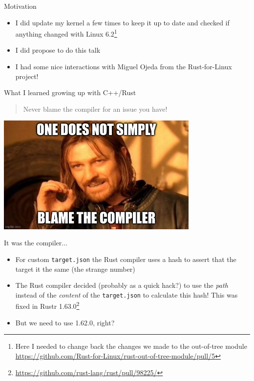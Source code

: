 \begin{frame}[c]{Motivation}
  \begin{itemize}
    \item I did update my kernel a few times to keep it up to date and checked
      if anything changed with Linux 6.2\footnote{Here I needed to change back
      the changes we made to the out-of-tree module
      \url{https://github.com/Rust-for-Linux/rust-out-of-tree-module/pull/5}}
    \item I did propose to do this talk
    \item I had some nice interactions with Miguel Ojeda from the
      Rust-for-Linux project!
  \end{itemize}
\end{frame}

\begin{frame}[c]{What I learned growing up with C++/Rust}
  \begin{quote}
    \centering
    Never blame the compiler for an issue you have!
  \end{quote}
  \pause \centering \includegraphics[width=0.75\textwidth]{img/one-does-not-simply-blame-the-compiler.jpg}
\end{frame}

\begin{frame}[c]{It was the compiler...}
  \begin{itemize}
    \item For custom \texttt{target.json} the Rust compiler uses a hash to
      assert that the target it the same (the strange number)
    \item The Rust compiler decided (probably as a quick hack?) to use the \emph{path} instead of the \emph{content} of the \texttt{target.json} to calculate this hash! This was fixed in Rustr 1.63.0\footnote{\url{https://github.com/rust-lang/rust/pull/98225/}}
      \pause\item But we need to use 1.62.0\pause, right?
  \end{itemize}
\end{frame}

